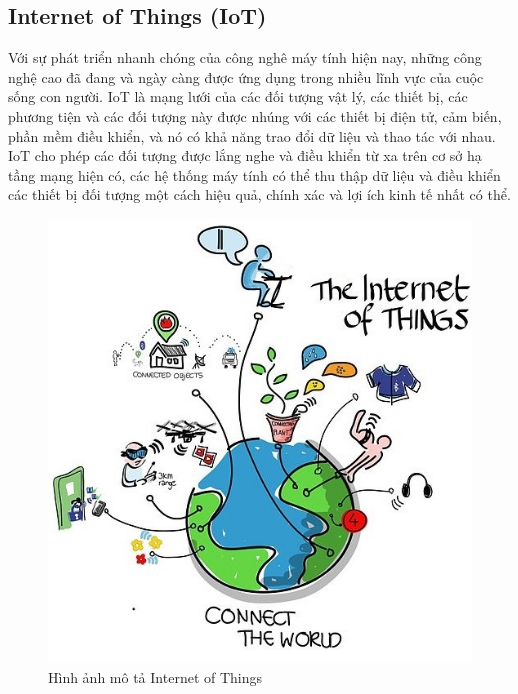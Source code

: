 \subsection{Internet of Things (IoT)}\label{sec:xuhuongiot}
Với sự phát triển nhanh chóng của công nghê máy tính hiện nay, những công nghệ cao đã đang và ngày càng được ứng dụng trong nhiều lĩnh vực của cuộc sống con người. IoT là mạng lưới của các đối tượng vật lý, các thiết bị, các phương tiện và các đối tượng này được nhúng với các thiết bị điện tử, cảm biến, phần mềm điều khiển, và nó có khả năng trao đổi dữ liệu và thao tác với nhau. IoT cho phép các đối tượng được lắng nghe và điều khiển từ xa trên cơ sở hạ tầng mạng hiện có, các hệ thống máy tính có thể thu thập dữ liệu và điều khiển các thiết bị đối tượng một cách hiệu quả, chính xác và lợi ích kinh tế nhất có thể. 
\begin{figure}[H] 
\centering    
\includegraphics[width=1.0\textwidth]{pic4}
\caption[Hình ảnh mô tả Internet of Things ]{Hình ảnh mô tả Internet of Things }
\label{fig:pic4}
\end{figure}


